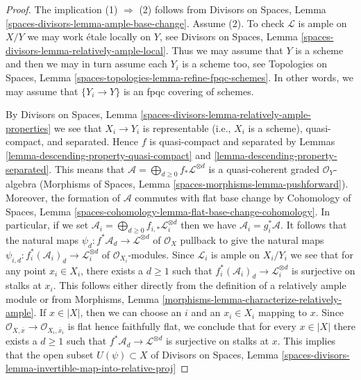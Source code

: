 \documentclass[10pt,a4paper]{amsart}
\theoremstyle{plain}
\theoremstyle{definition}
\theoremstyle{remark}
\numberwithin{equation}{subsection}
\begin{document}
\begin{proof}
The implication (1) $\Rightarrow$ (2) follows from
Divisors on Spaces, Lemma \ref{spaces-divisors-lemma-ample-base-change}.
Assume (2). To check $\mathcal{L}$ is ample on $X/Y$ we may
work \'etale locally on $Y$, see
Divisors on Spaces, Lemma \ref{spaces-divisors-lemma-relatively-ample-local}.
Thus we may assume that $Y$ is a scheme and then we may
in turn assume each $Y_i$ is a scheme too, see
Topologies on Spaces, Lemma \ref{spaces-topologies-lemma-refine-fpqc-schemes}.
In other words, we may assume that
$\{Y_i \to Y\}$ is an fpqc covering of schemes.

\medskip\noindent
By Divisors on Spaces, Lemma
\ref{spaces-divisors-lemma-relatively-ample-properties}
we see that $X_i \to Y_i$ is representable (i.e., $X_i$ is a scheme),
quasi-compact, and separated. Hence $f$ is quasi-compact and separated by
Lemmas \ref{lemma-descending-property-quasi-compact} and
\ref{lemma-descending-property-separated}.
This means that
$\mathcal{A} = \bigoplus_{d \geq 0} f_*\mathcal{L}^{\otimes d}$
is a quasi-coherent graded $\mathcal{O}_Y$-algebra
(Morphisms of Spaces, Lemma \ref{spaces-morphisms-lemma-pushforward}).
Moreover, the formation of $\mathcal{A}$ commutes with flat
base change by
Cohomology of Spaces, Lemma
\ref{spaces-cohomology-lemma-flat-base-change-cohomology}.
In particular, if we set
$\mathcal{A}_i = \bigoplus_{d \geq 0} f_{i, *}\mathcal{L}_i^{\otimes d}$
then we have $\mathcal{A}_i = g_i^*\mathcal{A}$.
It follows that the natural maps
$\psi_d : f^*\mathcal{A}_d \to \mathcal{L}^{\otimes d}$
of $\mathcal{O}_X$
pullback to give the natural maps
$\psi_{i, d} : f_i^*(\mathcal{A}_i)_d \to \mathcal{L}_i^{\otimes d}$
of $\mathcal{O}_{X_i}$-modules. Since $\mathcal{L}_i$ is ample on $X_i/Y_i$
we see that for any point $x_i \in X_i$, there exists a $d \geq 1$
such that $f_i^*(\mathcal{A}_i)_d \to \mathcal{L}_i^{\otimes d}$
is surjective on stalks at $x_i$. This follows either directly
from the definition of a relatively ample module or from
Morphisms, Lemma \ref{morphisms-lemma-characterize-relatively-ample}.
If $x \in |X|$, then we can choose an $i$ and an $x_i \in X_i$
mapping to $x$. Since
$\mathcal{O}_{X, \overline{x}} \to \mathcal{O}_{X_i, \overline{x}_i}$
is flat hence faithfully flat, we conclude that for every $x \in |X|$
there exists a $d \geq 1$ such that
$f^*\mathcal{A}_d \to \mathcal{L}^{\otimes d}$
is surjective on stalks at $x$.
This implies that the open subset $U(\psi) \subset X$ of
Divisors on Spaces, Lemma
\ref{spaces-divisors-lemma-invertible-map-into-relative-proj}

\end{proof}
\end{document}
